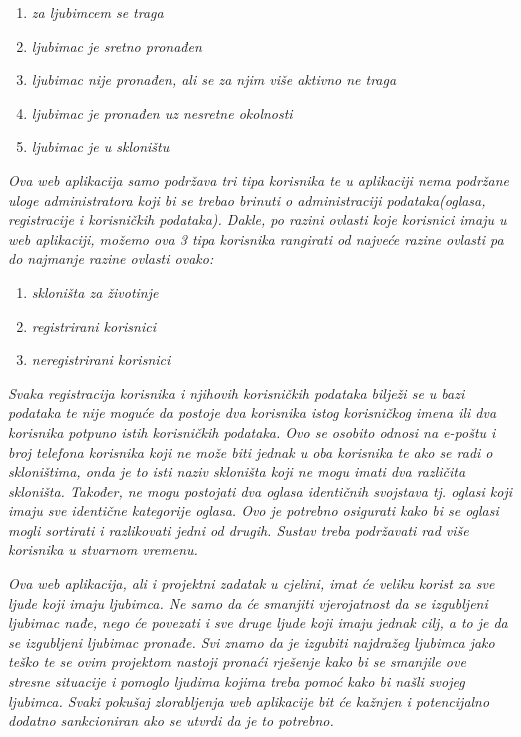 		\begin{enumerate}
			\item \textit{za ljubimcem se traga}
			\item \textit{ljubimac je sretno pronađen}
			\item \textit{ljubimac nije pronađen, ali se za njim više aktivno ne traga}
			\item \textit{ljubimac je pronađen uz nesretne okolnosti}
			\item \textit{ljubimac je u skloništu}
		\end{enumerate}
		
		\textit{Ova web aplikacija samo podržava tri tipa korisnika te u aplikaciji nema podržane uloge administratora koji bi se trebao brinuti o administraciji podataka(oglasa, registracije i korisničkih podataka). Dakle, po razini ovlasti koje korisnici imaju u web aplikaciji, možemo ova 3 tipa korisnika rangirati od najveće razine ovlasti pa do najmanje razine ovlasti ovako:}
		
		\begin{enumerate}
			\item \textit{skloništa za životinje}
			\item \textit{registrirani korisnici}
			\item \textit{neregistrirani korisnici}
		\end{enumerate}
		
		\textit{Svaka registracija korisnika i njihovih korisničkih podataka bilježi se u bazi podataka te nije moguće da postoje dva korisnika istog korisničkog imena ili dva korisnika potpuno istih korisničkih podataka. Ovo se osobito odnosi na e-poštu i broj telefona korisnika koji ne može biti jednak u oba korisnika te ako se radi o skloništima, onda je to isti naziv skloništa koji ne mogu imati dva različita skloništa. Također, ne mogu postojati dva oglasa identičnih svojstava tj. oglasi koji imaju sve identične kategorije oglasa. Ovo je potrebno osigurati kako bi se oglasi mogli sortirati i razlikovati jedni od drugih. Sustav treba podržavati rad više korisnika u stvarnom vremenu.}
		
		\textit{Ova web aplikacija, ali i projektni zadatak u cjelini, imat će veliku korist za sve ljude koji imaju ljubimca. Ne samo da će smanjiti vjerojatnost da se izgubljeni ljubimac nađe, nego će povezati i sve druge ljude koji imaju jednak cilj, a to je da se izgubljeni ljubimac pronađe. Svi znamo da je izgubiti najdražeg ljubimca jako teško te se ovim projektom nastoji pronaći rješenje kako bi se smanjile ove stresne situacije i pomoglo ljudima kojima treba pomoć kako bi našli svojeg ljubimca. Svaki pokušaj zlorabljenja web aplikacije bit će kažnjen i potencijalno dodatno sankcioniran ako se utvrdi da je to potrebno.}
		
